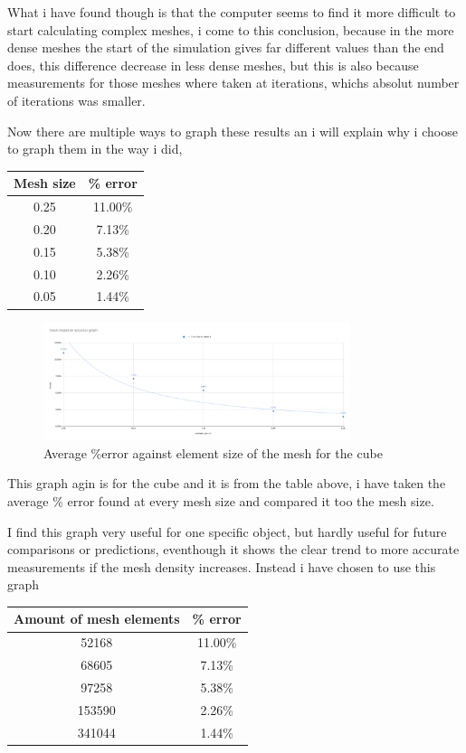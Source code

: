 \documentclass[12pt,a4paper]{article}
\begin{document}
What i have found though is that the computer seems to find it more difficult to start calculating complex meshes, i come to this conclusion, because in the more dense meshes the start of the simulation gives far different values than the end does, this difference decrease in less dense meshes, but this is also because measurements for those meshes where taken at iterations, whichs absolut number of iterations was smaller.

Now there are multiple ways to graph these results an i will explain why i choose to graph them in the way i did, 

\begin{table}[H]
\centering
\begin{tabular}{|c|c|}
\hline
\textbf{Mesh size} & \textbf{\% error} \\
\hline
0.25 & 11.00\% \\
\hline
0.20 & 7.13\% \\
\hline
0.15 & 5.38\% \\
\hline
0.10 & 2.26\% \\
\hline
0.05 & 1.44\% \\
\hline
\end{tabular}
\end{table}

\begin{figure}[H]
\centering
\includegraphics[width=0.8\textwidth]{image22.png}
\caption{Average \%error against element size of the mesh for the cube}
\label{fig:cube_mesh_error}
\end{figure}

This graph agin is for the cube and it is from the table above, i have taken the average \% error found at every mesh size and compared it too the mesh size.

I find this graph very useful for one specific object, but hardly useful for future comparisons or predictions, eventhough it shows the clear trend to more accurate measurements if the mesh density increases. Instead i have chosen to use this graph

\begin{table}[H]
\centering
\begin{tabular}{|c|c|}
\hline
\textbf{Amount of mesh elements} & \textbf{\% error} \\
\hline
52168 & 11.00\% \\
\hline
68605 & 7.13\% \\
\hline
97258 & 5.38\% \\
\hline
153590 & 2.26\% \\
\hline
341044 & 1.44\% \\
\hline
\end{tabular}
\end{table}
\end{document}
